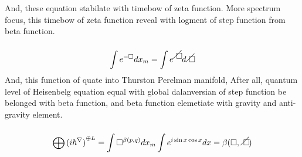 \documentclass{jsarticle}
\begin{document}
 And, these equation stabilate with timebow of zeta function.
 More spectrum focus, this timebow of zeta function reveal with
 logment of step function from beta function.
 $$ \int e^{-\square} dx_m = \int e^{\alearletter}d\alearletter $$
 And, this function of quate into Thurston Perelman manifold,
 After all, quantum level of Heisenbelg equation equal with global
 dalanversian of step function be belonged with beta function,
 and beta function elemetiate with gravity and anti-gravity element.


 $$ \bigoplus{(i\hbar^{\nabla})}^{\oplus L} = \int \square^{\beta(p,q)}
 dx_m \int e^{i\sin x \cos x}dx = \beta(\square,\alearletter) $$
\end{document}
